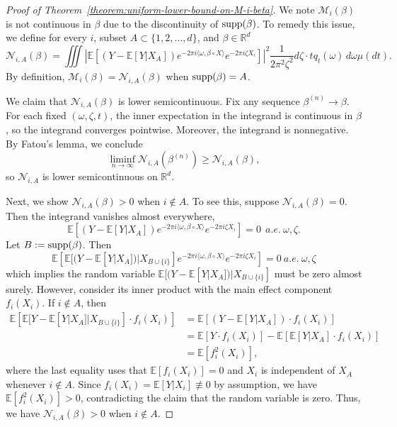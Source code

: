 \documentclass[sn-mathphys-num]{sn-jnl}%
\numberwithin{equation}{section}
\newcommand{\R}{\mathbb{R}}
\newcommand{\E}{\mathbb{E}}
\newcommand{\supp}{\mathop{\rm supp}}
\theoremstyle{thmstyleone}%
\theoremstyle{thmstyletwo}%
\theoremstyle{thmstylethree}%
\begin{document}
\begin{proof}[Proof of Theorem~\ref{theorem:uniform-lower-bound-on-M-i-beta}]
We note $\mathcal{M}_i(\beta)$ is not continuous in $\beta$ due to the discontinuity of $\supp(\beta)$. 
To remedy this issue, we define for every $i$, subset $A \subset \{1, 2, \ldots, d\}$, and $\beta \in \R^d$
\begin{equation*}
	 \mathcal{N}_{i, A}(\beta) = \iiint \left|\E[(Y-\E[Y|X_A]) e^{-2\pi i \langle \omega, \beta\circ X \rangle} e^{-2\pi i \zeta X_i}] \right|^2 \frac{1}{2\pi^2 \zeta^2} d\zeta \cdot t q_t(\omega) \, d\omega  \mu(dt).
\end{equation*} 
By definition, $\mathcal{M}_i(\beta)  = \mathcal{N}_{i, A}(\beta)$ when $\supp(\beta) = A$. 

We claim that $\mathcal{N}_{i, A}(\beta)$ is lower semicontinuous. Fix any sequence $\beta^{(n)} \to \beta$. For each fixed $(\omega, \zeta, t)$, the inner expectation in the integrand is continuous in $\beta$, so the integrand converges pointwise. Moreover, the integrand is nonnegative. By Fatou’s lemma, we conclude
\[
\liminf_{n \to \infty} \mathcal{N}_{i, A}(\beta^{(n)}) \ge \mathcal{N}_{i, A}(\beta),
\]
so $\mathcal{N}_{i, A}$ is lower semicontinuous on $\R^d$. 

Next, we show $\mathcal{N}_{i, A}(\beta)  > 0$ when $i \not \in A$. To see this, 
suppose $ \mathcal{N}_{i, A}(\beta) = 0$. Then the integrand vanishes almost everywhere, 
\begin{equation*}
	\mathbb{E}[(Y-\E[Y|X_A]) e^{-2\pi i \langle \omega, \beta \circ X \rangle}  e^{-2\pi i \zeta X_i}] = 0~~a.e.~\omega, \zeta.
\end{equation*}
Let $B:=\supp(\beta)$. Then
\begin{equation*}
	\E\left[\E[(Y-\E[Y|X_A])|X_{B \cup \{i\}}]e^{-2\pi i \langle \omega, \beta \circ X \rangle}  e^{-2\pi i \zeta X_i}\right] = 0~a.e.~\omega, \zeta
\end{equation*} 
which implies the random variable $\E[(Y-\E[Y|X_A])|X_{B \cup \{i\}}]$
must be zero almost surely. However, consider its
inner product with the main effect component $f_{{i}}(X_i)$. If $i \not\in A$, then 
\begin{equation*}
\begin{split}
\mathbb{E}\left[\mathbb{E}[Y - \mathbb{E}[Y | X_A] | X_{B \cup \{i\}}] \cdot f_{{i}}(X_i)\right]
&= \mathbb{E}[(Y - \mathbb{E}[Y | X_A]) \cdot f_{{i}}(X_i)] \\
&= \mathbb{E}[Y \cdot f_{{i}}(X_i)] - \mathbb{E}[\mathbb{E}[Y| X_A] \cdot f_{{i}}(X_i)] \\
&= \mathbb{E}[f_{{i}}^2(X_i)],
\end{split}
\end{equation*}
where the last equality uses that $\E[f_i(X_i)] = 0$ and $X_i$ is independent of $X_A$ whenever $i \notin A$. Since $f_i(X_i) = \E[Y | X_i] \not\equiv 0$ by assumption, we have $\E[f_i^2(X_i)] > 0$, contradicting the claim that the random variable is zero. Thus, 
we have $\mathcal{N}_{i, A}(\beta)  > 0$ when $i \not \in A$.



\end{proof}
\end{document}
